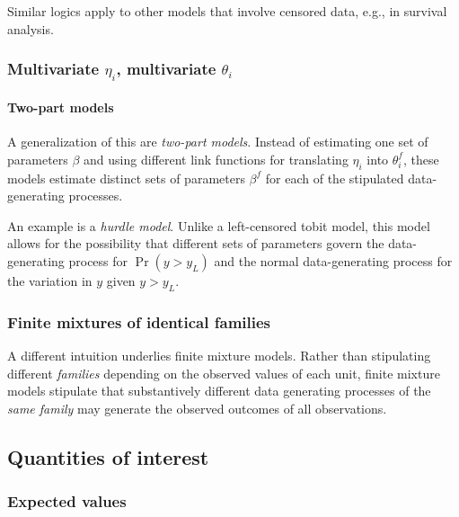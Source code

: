 \documentclass[
  11pt,
]{article}
\begin{document}
Similar logics apply to other models that involve censored data, e.g., in survival analysis.

\hypertarget{multivariate-eta_i-multivariate-theta_i-1}{%
\subsubsection{\texorpdfstring{Multivariate \(\eta_i\), multivariate \(\theta_i\)}{Multivariate \textbackslash eta\_i, multivariate \textbackslash theta\_i}}\label{multivariate-eta_i-multivariate-theta_i-1}}

\hypertarget{two-part-models}{%
\paragraph{Two-part models}\label{two-part-models}}

A generalization of this are \emph{two-part models}. Instead of estimating one set of parameters \(\beta\) and using different link functions for translating \(\eta_i\) into \(\theta_i^{f}\), these models estimate distinct sets of parameters \(\beta^{f}\) for each of the stipulated data-generating processes.

An example is a \emph{hurdle model}. Unlike a left-censored tobit model, this model allows for the possibility that different sets of parameters govern the data-generating process for \(\Pr(y > y_L)\) and the normal data-generating process for the variation in \(y\) given \(y > y_L\).

\hypertarget{finite-mixtures-of-identical-families}{%
\subsubsection{Finite mixtures of identical families}\label{finite-mixtures-of-identical-families}}

A different intuition underlies finite mixture models. Rather than stipulating different \emph{families} depending on the observed values of each unit, finite mixture models stipulate that substantively different data generating processes of the \emph{same family} may generate the observed outcomes of all observations.

\hypertarget{quantities-of-interest}{%
\subsection{Quantities of interest}\label{quantities-of-interest}}

\hypertarget{expected-values}{%
\subsubsection{Expected values}\label{expected-values}}
\end{document}

